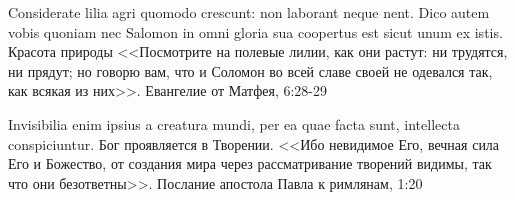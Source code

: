 \begin{theorem}\label{cyt:mat6:28}%
\textnormal{Considerate lilia agri quomodo crescunt: non laborant neque nent. Dico autem vobis quoniam nec Salomon in omni gloria sua coopertus est sicut unum ex istis.
Красота природы
<<Посмотрите на полевые лилии, как они растут: ни трудятся, ни прядут; но говорю вам, что и Соломон во всей славе своей не одевался так, как всякая из них>>.
Евангелие от Матфея, 6:28-29 %
}
\end{theorem}

\begin{theorem}\label{cyt:rim1:20}%
\textnormal{Invisibilia enim ipsius a creatura mundi, per ea quae facta sunt, intellecta conspiciuntur.
Бог проявляется в Творении.
<<Ибо невидимое Его, вечная сила Его и Божество, от создания мира через рассматривание творений видимы, так что они безответны>>.
Послание апостола Павла к римлянам, 1:20}
\end{theorem}